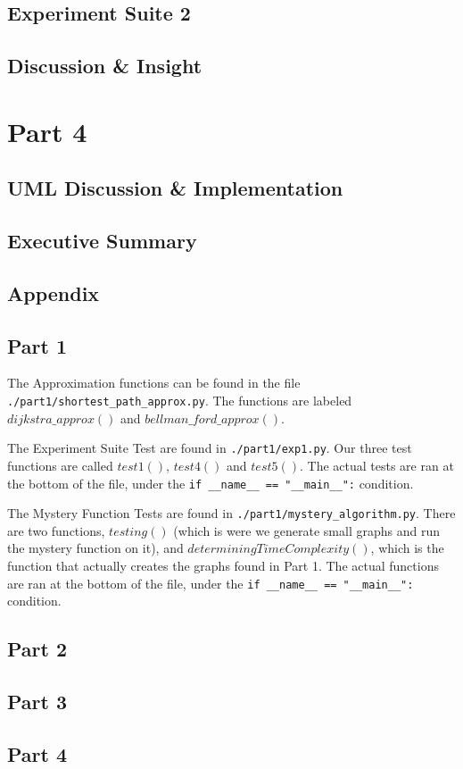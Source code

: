 \documentclass{article}
\begin{document}
\subsection{Experiment Suite 2}
\subsection{Discussion \& Insight}


\newpage
\section{Part 4}
\subsection{UML Discussion \& Implementation}

\newpage
\subsection{Executive Summary}

\newpage
\subsection{Appendix}

\subsection{Part 1}

The Approximation functions can be found in the file \verb|./part1/shortest_path_approx.py|.
The functions are labeled $dijkstra\_approx()$ and $bellman\_ford\_approx()$.

The Experiment Suite Test are found in \verb|./part1/exp1.py|. Our three test functions are called $test1()$, $test4()$ and  $test5()$. The actual tests are ran at the bottom of the file, under the \verb|if __name__ == "__main__":| condition.

The Mystery Function Tests are found in \verb|./part1/mystery_algorithm.py|. There are two functions, $testing()$ (which is were we generate small graphs and run the mystery function on it), and $determiningTimeComplexity()$, which is the function that actually creates the graphs found in Part 1. The actual functions are ran at the bottom of the file, under the \verb|if __name__ == "__main__":| condition.

\subsection{Part 2}

\subsection{Part 3}

\subsection{Part 4}
\end{document}
